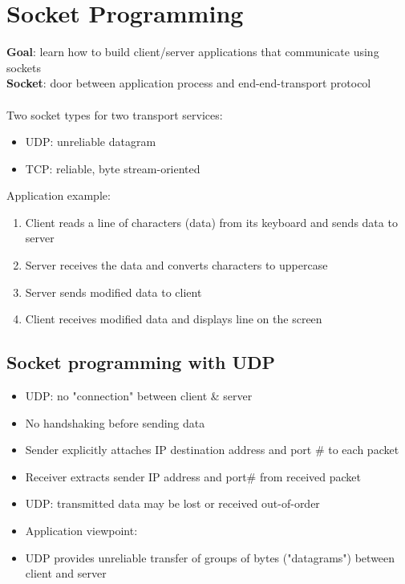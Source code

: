 \documentclass{article}[18pt]
\begin{document}
\section{Socket Programming}
\textbf{Goal}: learn how to build client/server applications that communicate using sockets\\
\textbf{Socket}: door between application process and end-end-transport protocol\\
\\
Two socket types for two transport services:
\begin{itemize}
	\item UDP: unreliable datagram
	\item TCP: reliable, byte stream-oriented
\end{itemize}
Application example:
\begin{enumerate}
	\item Client reads a line of characters (data) from its keyboard and sends data to server
	\item Server receives the data and converts characters to uppercase
	\item Server sends modified data to client
	\item Client receives modified data and displays line on the screen
\end{enumerate}
\subsection{Socket programming with UDP}
\begin{itemize}
	\item UDP: no "connection" between client \& server
	\item No handshaking before sending data
	\item Sender explicitly attaches IP destination address and port \# to each packet
	\item Receiver extracts sender IP address and port\# from received packet
	\item UDP: transmitted data may be lost or received out-of-order
	\item Application viewpoint:
	\item UDP provides unreliable transfer of groups of bytes ("datagrams") between client and server
\end{itemize}
\end{document}
